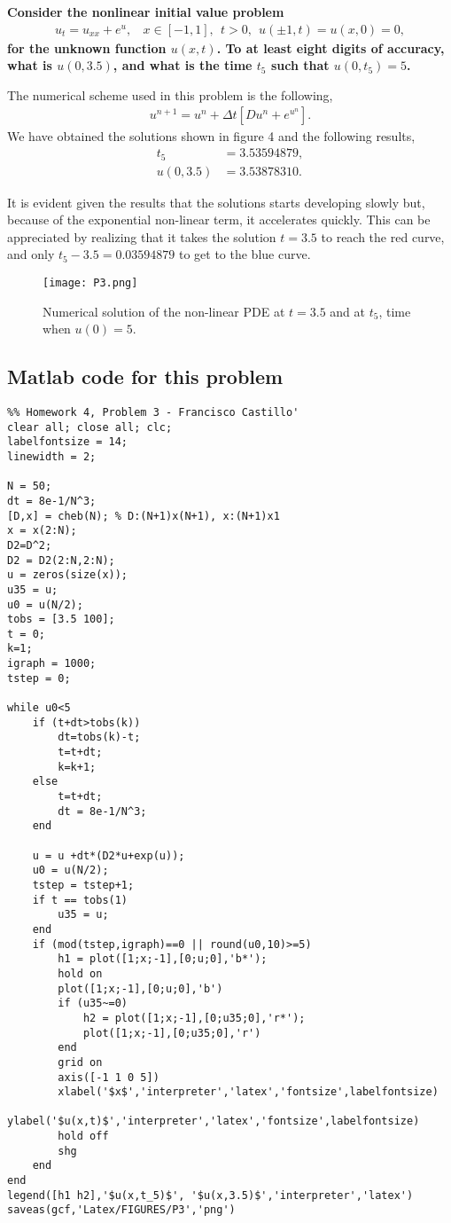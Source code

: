\textbf{Consider the nonlinear initial value problem
\begin{align*}
u_t=u_{xx}+e^u,~~~~x\in [-1,1],~~t>0,~~u(\pm 1,t)=u(x,0)=0,
\end{align*}
for the unknown function $u(x,t)$. To at least eight digits of accuracy, what is $u(0,3.5)$, and what is the time $t_5$ such that $u(0,t_5)=5$.
}
\newline

The numerical scheme used in this problem is the following,
\begin{align*}
u^{n+1}=u^{n}+\Delta t\left[Du^{n}+e^{u^{n}}\right].
\end{align*}
We have obtained the solutions shown in figure 4 and the following results,
\begin{align*}
t_5&=3.53594879,\\
u(0,3.5)&=3.53878310.
\end{align*}

It is evident given the results that the solutions starts developing slowly but, because of the exponential non-linear term, it accelerates quickly. This can be appreciated by realizing that it takes the solution $t=3.5$ to reach the red curve, and only $t_5-3.5 = 0.03594879$ to get to the blue curve.

\begin{figure}[H]
\centering
\texttt{[image: P3.png]}\caption{Numerical solution of the non-linear PDE at $t=3.5$ and at $t_5$, time when $u(0)=5$.}
\end{figure}

\subsection*{Matlab code for this problem}
\begin{verbatim}
%% Homework 4, Problem 3 - Francisco Castillo'
clear all; close all; clc;
labelfontsize = 14;
linewidth = 2;

N = 50;
dt = 8e-1/N^3;
[D,x] = cheb(N); % D:(N+1)x(N+1), x:(N+1)x1
x = x(2:N);
D2=D^2;
D2 = D2(2:N,2:N);
u = zeros(size(x));
u35 = u;
u0 = u(N/2);
tobs = [3.5 100];
t = 0;
k=1;
igraph = 1000;
tstep = 0;

while u0<5
    if (t+dt>tobs(k))
        dt=tobs(k)-t;
        t=t+dt;
        k=k+1;
    else
        t=t+dt;
        dt = 8e-1/N^3;
    end

    u = u +dt*(D2*u+exp(u));
    u0 = u(N/2);
    tstep = tstep+1;
    if t == tobs(1)
        u35 = u;
    end
    if (mod(tstep,igraph)==0 || round(u0,10)>=5)
        h1 = plot([1;x;-1],[0;u;0],'b*');
        hold on
        plot([1;x;-1],[0;u;0],'b')
        if (u35~=0)
            h2 = plot([1;x;-1],[0;u35;0],'r*');
            plot([1;x;-1],[0;u35;0],'r')
        end
        grid on
        axis([-1 1 0 5])
        xlabel('$x$','interpreter','latex','fontsize',labelfontsize)
        ylabel('$u(x,t)$','interpreter','latex','fontsize',labelfontsize)
        hold off
        shg
    end
end
legend([h1 h2],'$u(x,t_5)$', '$u(x,3.5)$','interpreter','latex')
saveas(gcf,'Latex/FIGURES/P3','png')
\end{verbatim}
